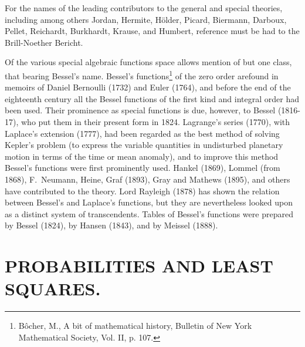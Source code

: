 \documentclass[oneside]{book}
\begin{document}
For the names of the leading contributors to the general and special
theories, including among others Jordan, Hermite, H\"older, Picard,
Biermann, Darboux, Pellet, Reichardt, Burkhardt, Krause, and
Humbert, reference must be had to the Brill-Noether Bericht.

Of the various special algebraic functions space allows mention of
but one class, that bearing Bessel's name. Bessel's
functions\footnote{B\^ocher, M., A bit of mathematical history,
Bulletin of New York Mathematical Society, Vol. II, p. 107.} of
the zero order arefound in memoirs of Daniel Bernoulli (1732) and
Euler (1764), and before the end of the eighteenth century all the
Bessel functions of the first kind and integral order had been used.
Their prominence as special functions is due, however, to
Bessel (1816-17), who put them in their present form in 1824. Lagrange's
series (1770), with Laplace's extension (1777), had been regarded as the
best method of solving Kepler's problem (to express the variable quantities
in undisturbed planetary motion in terms of the time or mean anomaly),
and to improve this method Bessel's functions were first prominently
used. Hankel (1869), Lommel (from 1868), F.~Neumann, Heine, Graf
(1893), Gray and Mathews (1895), and others have contributed to the
theory. Lord Rayleigh (1878) has shown the relation between
Bessel's and Laplace's functions, but they are nevertheless looked
upon as a distinct system of transcendents. Tables of Bessel's
functions were prepared by Bessel (1824), by Hansen (1843), and by
Meissel (1888).

\chapter{PROBABILITIES AND LEAST SQUARES.}
\end{document}
